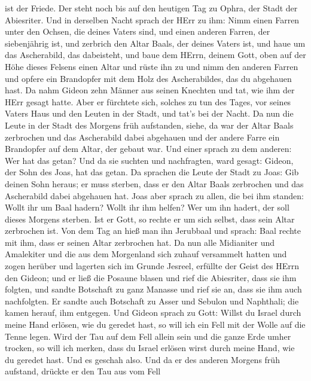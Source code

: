ist der Friede. Der steht noch bis auf den heutigen Tag zu Ophra, der
Stadt der Abiesriter.  Und in derselben Nacht sprach der
HErr zu ihm: Nimm einen Farren unter den Ochsen, die deines Vaters sind,
und einen anderen Farren, der siebenjährig ist, und zerbrich den Altar
Baals, der deines Vaters ist, und haue um das Ascherabild, das
dabeisteht,  und baue dem HErrn, deinem Gott, oben auf der
Höhe dieses Felsens einen Altar und rüste ihn zu und nimm den anderen
Farren und opfere ein Brandopfer mit dem Holz des Ascherabildes, das du
abgehauen hast.  Da nahm Gideon zehn Männer aus seinen
Knechten und tat, wie ihm der HErr gesagt hatte. Aber er fürchtete sich,
solches zu tun des Tages, vor seines Vaters Haus und den Leuten in der
Stadt, und tat's bei der Nacht.  Da nun die Leute in der
Stadt des Morgens früh aufstanden, siehe, da war der Altar Baals
zerbrochen und das Ascherabild dabei abgehauen und der andere Farre ein
Brandopfer auf dem Altar, der gebaut war.  Und einer sprach
zu dem anderen: Wer hat das getan? Und da sie suchten und nachfragten,
ward gesagt: Gideon, der Sohn des Joas, hat das getan.  Da
sprachen die Leute der Stadt zu Joas: Gib deinen Sohn heraus; er muss
sterben, dass er den Altar Baals zerbrochen und das Ascherabild dabei
abgehauen hat.  Joas aber sprach zu allen, die bei ihm
standen: Wollt ihr um Baal hadern? Wollt ihr ihm helfen? Wer um ihn
hadert, der soll dieses Morgens sterben. Ist er Gott, so rechte er um
sich selbst, dass sein Altar zerbrochen ist.  Von dem Tag
an hieß man ihn Jerubbaal und sprach: Baal rechte mit ihm, dass er
seinen Altar zerbrochen hat.  Da nun alle Midianiter und
Amalekiter und die aus dem Morgenland sich zuhauf versammelt hatten und
zogen herüber und lagerten sich im Grunde Jesreel, 
erfüllte der Geist des HErrn den Gideon; und er ließ die Posaune blasen
und rief die Abiesriter, dass sie ihm folgten,  und sandte
Botschaft zu ganz Manasse und rief sie an, dass sie ihm auch
nachfolgten. Er sandte auch Botschaft zu Asser und Sebulon und
Naphthali; die kamen herauf, ihm entgegen.  Und Gideon
sprach zu Gott: Willst du Israel durch meine Hand erlösen, wie du
geredet hast,  so will ich ein Fell mit der Wolle auf die
Tenne legen. Wird der Tau auf dem Fell allein sein und die ganze Erde
umher trocken, so will ich merken, dass du Israel erlösen wirst durch
meine Hand, wie du geredet hast.  Und es geschah also. Und
da er des anderen Morgens früh aufstand, drückte er den Tau aus vom Fell
